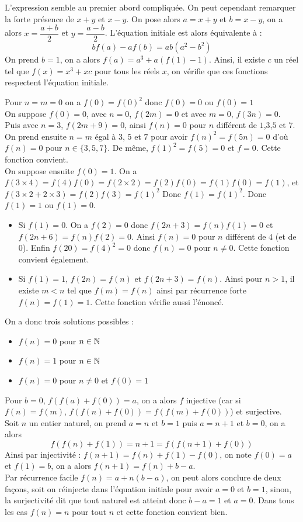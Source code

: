 \begin{sol}[][7]
L'expression semble au premier abord compliquée. On peut cependant remarquer la forte présence de $x+y$ et $x-y$. On pose alors $a=x+y$ et $b=x-y$, on a alors $x=\dfrac{a+b}2$ et $y=\dfrac{a-b}2$. L'équation initiale est alors équivalente à : $$bf(a)-af(b)=ab(a^2-b^2)$$ On prend $b=1$, on a alors $f(a)=a^3+a(f(1)-1)$. Ainsi, il existe $c$ un réel tel que $f(x)=x^3+xc$ pour tous les réels $x$, on vérifie que ces fonctions respectent l'équation initiale.
\end{sol}
\begin{sol}[][8]
Pour $n=m=0$ on a $f(0)=f(0)^2$ donc $f(0)=0$ ou $f(0)=1$\\
On suppose $f(0)=0$, avec $n=0$, $f(2m)=0$ et avec $m=0$, $f(3n)=0$. Puis avec $n=3$, $f(2m+9)=0$, ainsi $f(n)=0$ pour $n$ différent de $1$,$3$,$5$ et $7$. On prend ensuite $n=m$ égal à $3$, $5$ et $7$ pour avoir $f(n)^2=f(5n)=0$ d'où $f(n)=0$ pour $n\in\{3,5,7\}$. De même, $f(1)^2=f(5)=0$ et $f=0$. Cette fonction convient.\\
On suppose ensuite $f(0)=1$. On a $f(3 \times 4) = f(4)f(0) = f(2 \times 2) = f(2)f(0) = f(1)f(0) = f(1)$, et $f(3 \times2 +
2 \times 3) = f(2)f(3) = f(1)^2$ Donc $f(1) = f(1)^2$. Donc $f(1) = 1$ ou $f(1) = 0$.\\
\begin{itemize}
    \item Si $f(1)=0$. On a $f(2)=0$ donc $f(2n+3)=f(n)f(1)=0$ et $f(2n+6)=f(n)f(2)=0$. Ainsi $f(n)=0$ pour $n$ différent de $4$ (et de $0$). Enfin $f(20)=f(4)^2=0$ donc $f(n)=0$ pour $n\ne 0$. Cette fonction convient également.
    \item Si $f(1)=1$, $f(2n)=f(n)$ et $f(2n+3)=f(n)$. Ainsi pour $n>1$, il existe $m<n$ tel que $f(m)=f(n)$ ainsi par récurrence forte $f(n)=f(1)=1$. Cette fonction vérifie aussi l'énoncé.
\end{itemize}
On a donc trois solutions possibles :
\begin{itemize}
    \item $f(n)=0$ pour $n\in\mathbb N$
    \item $f(n)=1$ pour $n\in\mathbb N$
    \item $f(n)=0$ pour $n\ne 0$ et $f(0)=1$
\end{itemize}
\end{sol}
\begin{sol}[][9]
Pour $b=0$, $f(f(a)+f(0))=a$, on a alors $f$ injective (car si $f(n)=f(m)$, $f(f(n)+f(0))=f(f(m)+f(0))$) et surjective.\\
Soit $n$ un entier naturel, on prend $a=n$ et $b=1$ puis $a=n+1$ et $b=0$, on a alors
$$f(f(n)+f(1))=n+1=f(f(n+1)+f(0))$$
Ainsi par injectivité : $f(n+1)=f(n)+f(1)-f(0)$, on note $f(0)=a$ et $f(1)=b$, on a alors $f(n+1)=f(n)+b-a$.\\
Par récurrence facile $f(n)=a+n(b-a)$, on peut alors conclure de deux façons, soit on réinjecte dans l'équation initiale pour avoir $a=0$ et $b=1$, sinon, la surjectivité dit que tout naturel est atteint donc $b-a=1$ et $a=0$. Dans tous les cas $f(n)=n$ pour tout $n$ et cette fonction convient bien.
\end{sol}
